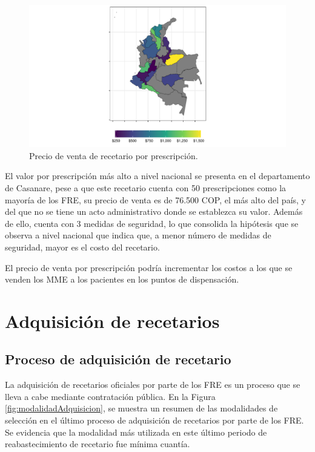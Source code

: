 \documentclass[
  oneside]{book}
\begin{document}
\begin{figure}

{\centering \includegraphics[width=0.9\linewidth]{InformeFinal_files/figure-latex/PVTA-Recetarios-1} 

}

\caption{Precio de venta de recetario por prescripción.}\label{fig:PVTA-Recetarios}
\end{figure}

El valor por prescripción más alto a nivel nacional se presenta en el departamento de Casanare, pese a que este recetario cuenta con 50 prescripciones como la mayoría de los FRE, su precio de venta es de 76.500 COP, el más alto del país, y del que no se tiene un acto administrativo donde se establezca su valor. Además de ello, cuenta con 3 medidas de seguridad, lo que consolida la hipótesis que se observa a nivel nacional que indica que, a menor número de medidas de seguridad, mayor es el costo del recetario.

El precio de venta por prescripción podría incrementar los costos a los que se venden los MME a los pacientes en los puntos de dispensación.

\hypertarget{adquisiciuxf3n-de-recetarios}{%
\section{Adquisición de recetarios}\label{adquisiciuxf3n-de-recetarios}}


\hypertarget{proceso-de-adquisiciuxf3n-de-recetario}{%
\subsection{Proceso de adquisición de recetario}\label{proceso-de-adquisiciuxf3n-de-recetario}}

La adquisición de recetarios oficiales por parte de los FRE es un proceso que se lleva a cabe mediante contratación pública. En la Figura \ref{fig:modalidadAdquisicion}, se muestra un resumen de las modalidades de selección en el último proceso de adquisición de recetarios por parte de los FRE. Se evidencia que la modalidad más utilizada en este último periodo de reabastecimiento de recetario fue mínima cuantía.
\end{document}
